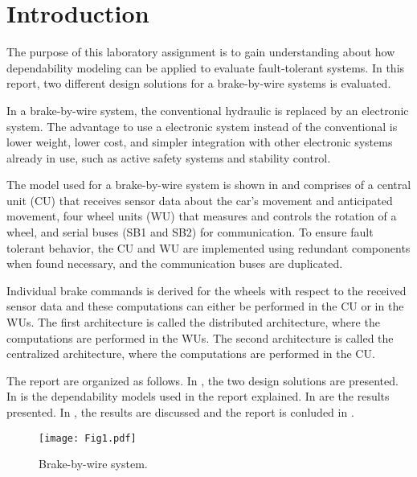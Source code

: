 \newpage
\section{Introduction}
\label{S1}
The purpose of this laboratory assignment is to gain understanding about how dependability modeling can be applied to evaluate fault-tolerant systems. In this report, two different design solutions for a brake-by-wire systems is evaluated.
 
In a brake-by-wire system, the conventional hydraulic is replaced by an electronic system. The advantage to use a electronic system instead of the conventional is lower weight, lower cost, and simpler integration with other electronic systems already in use, such as active safety systems and stability control. 


The model used for a brake-by-wire system is shown in  and comprises of a central unit (CU) that receives sensor data about the car's movement and anticipated movement, four wheel units (WU) that measures and controls the rotation of a wheel, and serial buses (SB1 and SB2) for communication. To ensure fault tolerant behavior, the CU and WU are implemented using redundant components when found necessary, and the communication buses are duplicated. 

Individual brake commands is derived for the wheels with respect to the received sensor data and these computations can either be performed in the CU or in the WUs. The first architecture is called the distributed architecture, where the computations are performed in the WUs. The second architecture is called the centralized architecture, where the computations are performed in the CU.

The report are organized as follows. In , the two design solutions are presented. In  is the dependability models used in the report explained. In  are the results presented. In , the results are discussed and the report is conluded in .

\begin{figure}[h!]
  \centering
  \texttt{[image: Fig1.pdf]}
  \caption{Brake-by-wire system.}
  \label{bbwsys}
\end{figure}